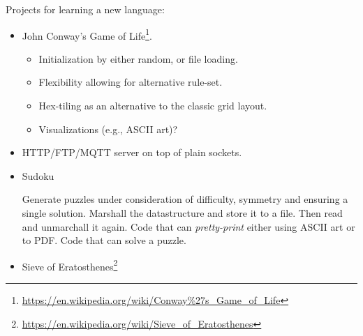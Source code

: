 Projects for learning a new language:
\begin{itemize}
  \item John Conway's Game of Life\footnote{\url{https://en.wikipedia.org/wiki/Conway\%27s_Game_of_Life}}\cite{Gardener1970MathematicalGT}.
    \begin{itemize}
      \item Initialization by either random, or file loading.
      \item Flexibility allowing for alternative rule-set.
      \item Hex-tiling as an alternative to the classic grid layout.
      \item Visualizations (e.g., ASCII art)?
    \end{itemize}
  \item HTTP/FTP/MQTT server on top of plain sockets.
  \item Sudoku
    \begin{itemize}
       Generate puzzles under consideration of difficulty, symmetry and ensuring a single solution.
       Marshall the datastructure and store it to a file. Then read and unmarchall it again.
       Code that can \textsl{pretty-print} either using ASCII art or to PDF.
       Code that can solve a puzzle.
    \end{itemize}
  \item Sieve of Eratosthenes\footnote{\url{https://en.wikipedia.org/wiki/Sieve_of_Eratosthenes}}
\end{itemize}










